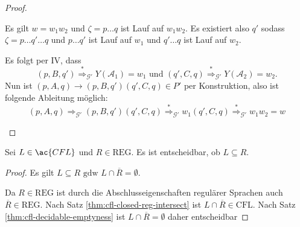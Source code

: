 {\begin{proof}
\begin{itemize}
\begin{description}
\begin{itemize}
          Es gilt $w = w_1w_2$ und $\zeta = p\ldots q$ ist Lauf auf $w_1w_2$.
          Es existiert also $q'$ sodass $\zeta = p\ldots q' \ldots q$ und $p\ldots q'$ ist Lauf auf $w_1$ und $q' \ldots q$ ist Lauf auf $w_2$.

          Es folgt per IV, dass
          \begin{displaymath}
            (p, B, q') \stackrel{*}{\Longrightarrow}_{\mathcal{G}'} Y(\mathcal{A}_1) = w_1 \text{ und } (q', C, q) \stackrel{*}{\Longrightarrow}_{\mathcal{G}'} Y(\mathcal{A}_2) = w_2.
          \end{displaymath}
          Nun ist $(p,A,q) \to (p,B,q')(q',C,q) \in P'$ per Konstruktion, also ist folgende Ableitung möglich:
          \begin{displaymath}
            (p,A,q) \Longrightarrow_{\mathcal{G}'} (p,B,q')(q',C,q) \stackrel{*}{\Longrightarrow}_{\mathcal{G}'} w_1(q',C,q) \stackrel{*}{\Longrightarrow}_{\mathcal{G}'} w_1w_2 = w
          \end{displaymath}
        \end{itemize}
    \end{description}
  \end{itemize}
  \end{proof}
%
\begin{Satz}[name={[$L\subseteq R$ entscheidbar]}] %
	Sei $L\in\ac{CFL}$ und $R\in\textrm{REG}$. Es ist entscheidbar, ob $L\subseteq R$.
\end{Satz}
\begin{proof}
  Es gilt $L\subseteq R \text{ gdw } L \cap\overline{R} = \emptyset$.

  Da $R \in \mathrm{REG}$ ist durch die Abschlusseigenschaften regulärer Sprachen auch $\overline{R} \in \mathrm{REG}$.
  Nach Satz \ref{thm:cfl-closed-reg-intersect} ist $L \cap\overline{R} \in \mathrm{CFL}$.
  Nach Satz \ref{thm:cfl-decidable-emptyness} ist $L \cap\overline{R} = \emptyset$ daher entscheidbar
\end{proof}
}
